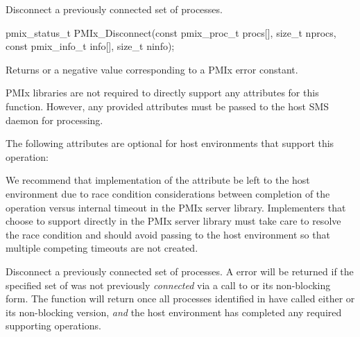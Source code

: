 \summary

Disconnect a previously connected set of processes.

\format

\cspecificstart
\begin{codepar}
pmix_status_t
PMIx_Disconnect(const pmix_proc_t procs[], size_t nprocs,
                const pmix_info_t info[], size_t ninfo);
\end{codepar}
\cspecificend

\begin{arglist}
\end{arglist}

Returns  or a negative value corresponding to a PMIx error constant.

\reqattrstart
\ac{PMIx} libraries are not required to directly support any attributes for this function. However, any provided attributes must be passed to the host \ac{SMS} daemon for processing.

\reqattrend

\optattrstart
The following attributes are optional for host environments that support this operation:


\optattrend

\adviceimplstart
We recommend that implementation of the  attribute be left to the host environment due to race condition considerations between completion of the operation versus internal timeout in the \ac{PMIx} server library. Implementers that choose to support  directly in the \ac{PMIx} server library must take care to resolve the race condition and should avoid passing  to the host environment so that multiple competing timeouts are not created.
\adviceimplend


\descr

Disconnect a previously connected set of processes.
A  error will be returned if the specified set of  was not previously \textit{connected} via a call to  or its non-blocking form. The function will return once all processes identified in  have called either  or its non-blocking version, \textit{and} the host environment has completed any required supporting operations.

